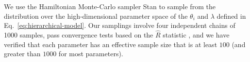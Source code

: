 \documentclass[modern]{aastex62}
\begin{document}
We use the Hamiltonian Monte-Carlo sampler Stan \citep{Stan} to sample from the
distribution over the high-dimensional parameter space of the $\theta_i$ and
$\lambda$ defined in Eq.\ \eqref{eq:hierarchical-model}.  Our samplings involve
four independent chains of 1000 samples, pass convergence tests based on the
$\hat{R}$ statistic \citep{Gelman1992}, and we have verified that each parameter
has an effective sample size that is at least $100$ (and greater than $1000$ for
most parameters).
\end{document}
